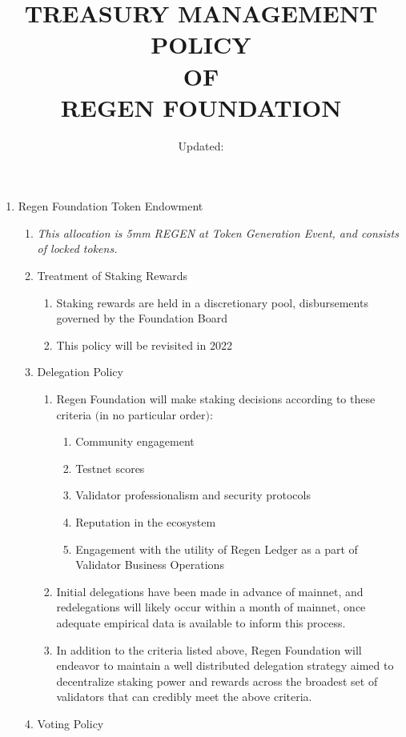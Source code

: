 \documentclass{article}
\begin{document}
\title{TREASURY MANAGEMENT POLICY \protect\\ OF \protect\\ REGEN FOUNDATION}
\author{Updated:}
\maketitle
\begin{enumerate}
\item Regen Foundation Token Endowment
\begin{enumerate}
\item {\it This allocation is 5mm REGEN at Token Generation Event, and consists of locked tokens.}
\item Treatment of Staking Rewards
\begin{enumerate}
\item Staking rewards are held in a discretionary pool, disbursements governed by the Foundation Board
\item This policy will be revisited in 2022
\end{enumerate}
\item Delegation Policy
\begin{enumerate}
\item Regen Foundation will make staking decisions according to these criteria $($in no particular order$)$:
\begin{enumerate}
\item Community engagement
\item Testnet scores
\item Validator professionalism and security protocols
\item Reputation in the ecosystem
\item Engagement with the utility of Regen Ledger as a part of Validator Business Operations
\end{enumerate}
\item Initial delegations have been made in advance of mainnet, and redelegations will likely occur within a month of mainnet, once adequate empirical data is available to inform this process.
\item In addition to the criteria listed above, Regen Foundation will endeavor to maintain a well distributed delegation strategy aimed to decentralize staking power and rewards across the broadest set of validators that can credibly meet the above criteria. 
\end{enumerate}
\item Voting Policy
\begin{enumerate}

\end{enumerate}
\end{enumerate}
\end{enumerate}
\end{document}
